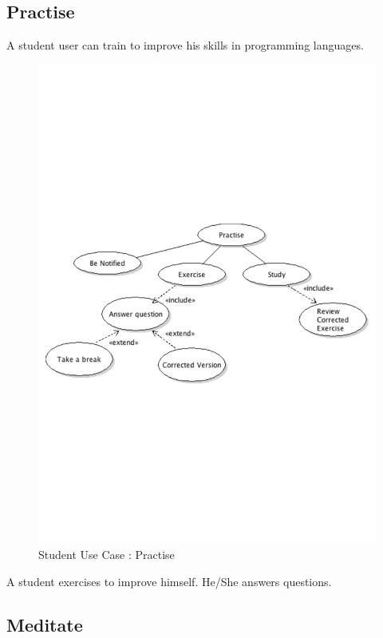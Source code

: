 	\subsection{Practise}
		A student user can train to improve his skills in programming languages. 
		
		\begin{figure}[ht]
			\begin{center}
				\includegraphics[width=\textwidth,  trim=2cm 10cm 2cm 11cm]{UML_figure/UC/student/UC_Student_Practise.pdf}
				\caption{Student Use Case : Practise}
			\end{center}
		\end{figure}
		A student exercises to improve himself. He/She answers questions.
	
	\subsection{Meditate}
	
